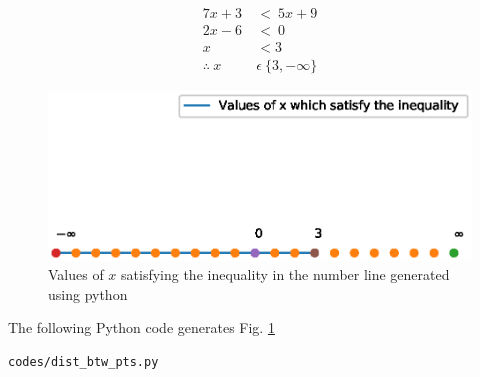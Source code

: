 \solution 
\begin{align}
7x+3\ &<\ 5x+9 \\
2x - 6\  &< \  0 \\
x &< 3 \\
\therefore\  x\  &\epsilon\  \{3, -\infty \}
\end{align}

\begin{figure}[!ht]
\centering
\includegraphics[width=\columnwidth]{./figs/number_line.eps}
\caption{Values of $x$ satisfying the inequality in the number line generated using python}
\label{fig:numberline}
\end{figure} 

The  following Python code generates Fig. \ref{fig:numberline}
\begin{lstlisting}
codes/dist_btw_pts.py
\end{lstlisting}



